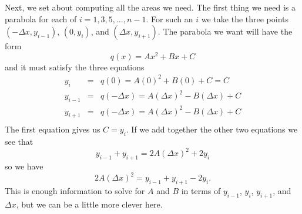 \documentclass[reqno, 12pt]{amsart}
\begin{document}
Next, we set about computing all the areas we need.
The first thing we need is a parabola for each of \(i = 1, 3, 5, \ldots, n-1\).
For such an \(i\) we take the three points \((-\Delta x, y_{i-1})\), \((0,y_i)\), and \((\Delta x, y_{i+1})\).
The parabola we want will have the form
\[q(x) = Ax^2 + Bx + C\]
and it must satisfy the three equations
\begin{eqnarray*}
  y_i &=& q(0) = A(0)^2 + B(0) + C = C\\
  y_{i - 1} &=& q(-\Delta x) = A(\Delta x)^2 - B(\Delta x) + C\\
  y_{i + 1} &=& q(-\Delta x) = A(\Delta x)^2 - B(\Delta x) + C\\
\end{eqnarray*}
The first equation gives us \(C = y_i\).
If we add together the other two equations we see that
\[y_{i-1} + y_{i + 1} = 2A(\Delta x)^2 + 2y_i\]
so we have
\[2A(\Delta x)^2 = y_{i - 1} + y_{i + 1} - 2y_i.\]
This is enough information to solve for \(A\) and \(B\) in terms of \(y_{i - 1}\), \(y_i\), \(y_{i+1}\), and \(\Delta x\), but we can be a little more clever here.
\end{document}
